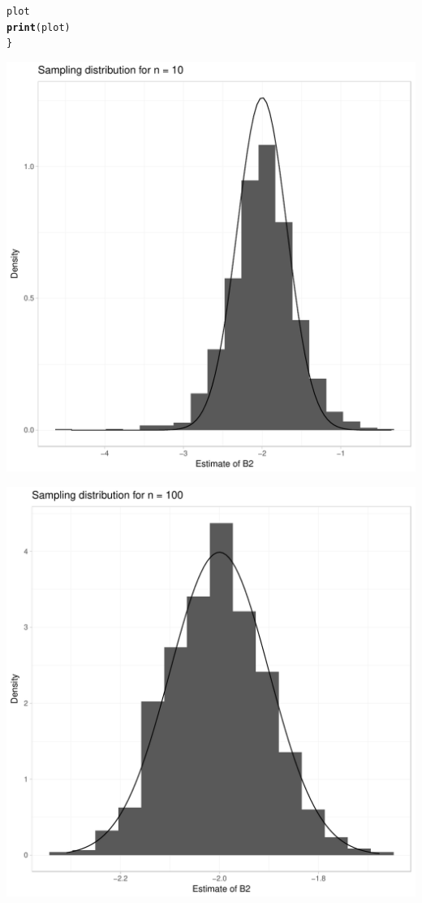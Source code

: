 \documentclass[english, 11pt]{article}\usepackage[]{graphicx}\usepackage[]{color}
\makeatletter
\def\maxwidth{ %
  \ifdim\Gin@nat@width>\linewidth
    \linewidth
  \else
    \Gin@nat@width
  \fi
}
\newcommand{\hlstd}[1]{\textcolor[rgb]{0.345,0.345,0.345}{#1}}%
\newcommand{\hlkwd}[1]{\textcolor[rgb]{0.737,0.353,0.396}{\textbf{#1}}}%
\newenvironment{kframe}{%
 \def\at@end@of@kframe{}%
 \ifinner\ifhmode%
  \def\at@end@of@kframe{\end{minipage}}%
  \begin{minipage}{\columnwidth}%
 \fi\fi%
 \def\FrameCommand##1{\hskip\@totalleftmargin \hskip-\fboxsep
 \colorbox{shadecolor}{##1}\hskip-\fboxsep
     \hskip-\linewidth \hskip-\@totalleftmargin \hskip\columnwidth}%
 \MakeFramed {\advance\hsize-\width
   \@totalleftmargin\z@ \linewidth\hsize
   \@setminipage}}%
 {\par\unskip\endMakeFramed%
 \at@end@of@kframe}
\newenvironment{knitrout}{}{} %
\makeatother
\begin{document}
\begin{knitrout}
\begin{kframe}
\begin{alltt}
  \hlstd{plot}
  \hlkwd{print}\hlstd{(plot)}
\hlstd{\}}
\end{alltt}
\end{kframe}
\includegraphics[width=\maxwidth]{figure/Q2_looping-1} 

\includegraphics[width=\maxwidth]{figure/Q2_looping-2} 


\end{knitrout}
\end{document}
